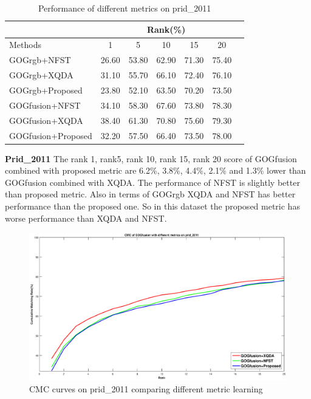 \documentclass[conference,compsoc]{IEEEtran}
\begin{document}


\begin{table}[H]
\caption{Performance of different metrics on prid\_2011}
\centering
\begin{tabular}{|l|c|c|c|c|c|c|}
\hline
& \multicolumn{5}{|c|}{Rank(\%)} \\
\hline
Methods& 1 & 5 &10& 15&20\\
\hline
GOGrgb+NFST&26.60 &53.80& 62.90&71.30&75.40 \\ 
\hline
GOGrgb+XQDA&31.10 & 55.70& 66.10 & 72.40&76.10\\  
\hline
GOGrgb+Proposed&23.80& 52.10& 63.50&70.20&73.50\\  %
\hline
GOGfusion+NFST&34.10 &58.30& 67.60&73.80&78.30 \\  
\hline
GOGfusion+XQDA&38.40& 61.30&70.80&75.60&79.30\\
\hline
GOGfusion+Proposed&32.20&57.50&66.40&73.50&78.00\\ %

\hline

\end{tabular}\newline
\end{table}
\textbf{Prid\_2011}  The  rank 1, rank5, rank 10, rank 15, rank 20 score of GOGfusion  combined with proposed metric are 6.2\%, 3.8\%, 4.4\%, 2.1\% and 1.3\% lower than GOGfusion combined with XQDA. The performance of NFST is slightly better than proposed metric. Also in terms of GOGrgb XQDA and NFST has better performance than the proposed one. So in this dataset the proposed metric has worse performance than XQDA and NFST.

\begin{figure}
\begin{raggedleft}
\includegraphics[width=1\linewidth]{prid2011.eps}
\vspace{-3em}
\caption{CMC curves on prid\_2011 comparing different metric learning}
\end{raggedleft}
\end{figure}
\end{document}

